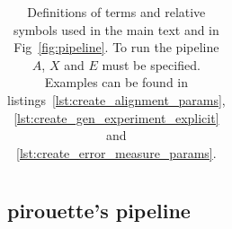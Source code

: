 \begin{table}
\begin{tabular}{|@{}c|p{4cm}|p{12cm}|}

    \hline 
  \end{tabular}
  \caption{
    Definitions of terms and relative symbols used in the main text and in 
    Fig~\ref{fig:pipeline}. To run the pipeline $\mathit{A}$, $\mathit{X}$ 
    and $\mathit{E}$ must be specified. Examples can be found in 
    listings~\ref{lst:create_alignment_params}, 
    \ref{lst:create_gen_experiment_explicit} and 
    \ref{lst:create_error_measure_params}.
  }
  \label{tab:definitions}
\end{table}

\subsection{pirouette's pipeline}
\label{subsec:pipeline}


